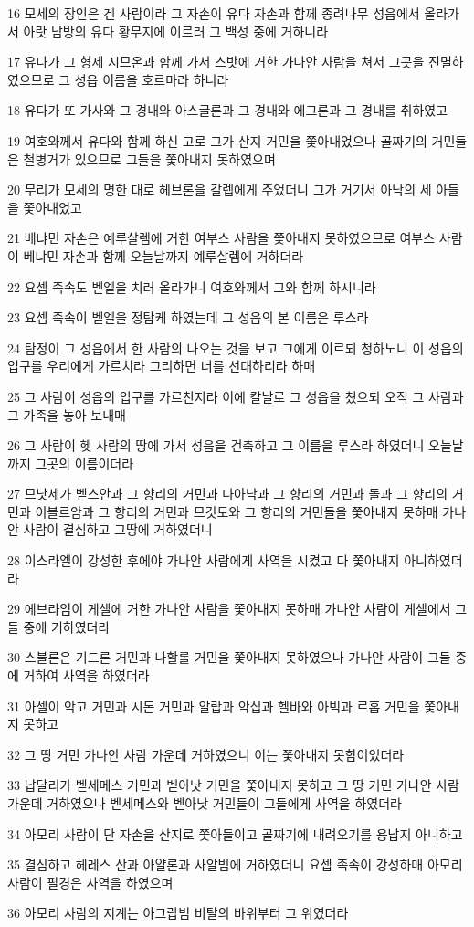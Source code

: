 \par 16 모세의 장인은 겐 사람이라 그 자손이 유다 자손과 함께 종려나무 성읍에서 올라가서 아랏 남방의 유다 황무지에 이르러 그 백성 중에 거하니라
\par 17 유다가 그 형제 시므온과 함께 가서 스밧에 거한 가나안 사람을 쳐서 그곳을 진멸하였으므로 그 성읍 이름을 호르마라 하니라
\par 18 유다가 또 가사와 그 경내와 아스글론과 그 경내와 에그론과 그 경내를 취하였고
\par 19 여호와께서 유다와 함께 하신 고로 그가 산지 거민을 쫓아내었으나 골짜기의 거민들은 철병거가 있으므로 그들을 쫓아내지 못하였으며
\par 20 무리가 모세의 명한 대로 헤브론을 갈렙에게 주었더니 그가 거기서 아낙의 세 아들을 쫓아내었고
\par 21 베냐민 자손은 예루살렘에 거한 여부스 사람을 쫓아내지 못하였으므로 여부스 사람이 베냐민 자손과 함께 오늘날까지 예루살렘에 거하더라
\par 22 요셉 족속도 벧엘을 치러 올라가니 여호와께서 그와 함께 하시니라
\par 23 요셉 족속이 벧엘을 정탐케 하였는데 그 성읍의 본 이름은 루스라
\par 24 탐정이 그 성읍에서 한 사람의 나오는 것을 보고 그에게 이르되 청하노니 이 성읍의 입구를 우리에게 가르치라 그리하면 너를 선대하리라 하매
\par 25 그 사람이 성읍의 입구를 가르친지라 이에 칼날로 그 성읍을 쳤으되 오직 그 사람과 그 가족을 놓아 보내매
\par 26 그 사람이 헷 사람의 땅에 가서 성읍을 건축하고 그 이름을 루스라 하였더니 오늘날까지 그곳의 이름이더라
\par 27 므낫세가 벧스안과 그 향리의 거민과 다아낙과 그 향리의 거민과 돌과 그 향리의 거민과 이블르암과 그 향리의 거민과 므깃도와 그 향리의 거민들을 쫓아내지 못하매 가나안 사람이 결심하고 그땅에 거하였더니
\par 28 이스라엘이 강성한 후에야 가나안 사람에게 사역을 시켰고 다 쫓아내지 아니하였더라
\par 29 에브라임이 게셀에 거한 가나안 사람을 쫓아내지 못하매 가나안 사람이 게셀에서 그들 중에 거하였더라
\par 30 스불론은 기드론 거민과 나할롤 거민을 쫓아내지 못하였으나 가나안 사람이 그들 중에 거하여 사역을 하였더라
\par 31 아셀이 악고 거민과 시돈 거민과 알랍과 악십과 헬바와 아빅과 르홉 거민을 쫓아내지 못하고
\par 32 그 땅 거민 가나안 사람 가운데 거하였으니 이는 쫓아내지 못함이었더라
\par 33 납달리가 벧세메스 거민과 벧아낫 거민을 쫓아내지 못하고 그 땅 거민 가나안 사람 가운데 거하였으나 벧세메스와 벧아낫 거민들이 그들에게 사역을 하였더라
\par 34 아모리 사람이 단 자손을 산지로 쫓아들이고 골짜기에 내려오기를 용납지 아니하고
\par 35 결심하고 헤레스 산과 아얄론과 사알빔에 거하였더니 요셉 족속이 강성하매 아모리 사람이 필경은 사역을 하였으며
\par 36 아모리 사람의 지계는 아그랍빔 비탈의 바위부터 그 위였더라

